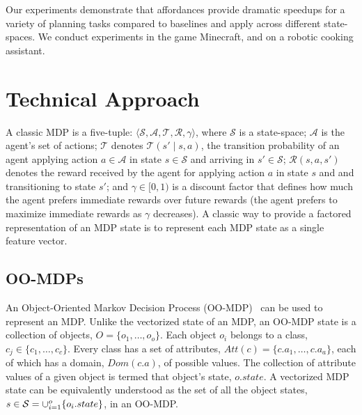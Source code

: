 \documentclass[conference]{IEEEtran}
\begin{document}
Our experiments demonstrate that affordances provide dramatic speedups for a variety
of planning tasks compared to baselines and apply across different state-spaces.  We 
conduct experiments in the game Minecraft, and on a robotic cooking assistant. 

\section{Technical Approach}
\label{sec:technical_approach}
A classic MDP is a five-tuple: $\langle \mathcal{S}, \mathcal{A}, \mathcal{T},
\mathcal{R}, \gamma \rangle$, where $\mathcal{S}$ is a state-space;
$\mathcal{A}$ is the agent's set of actions; $\mathcal{T}$ denotes
$\mathcal{T}(s' \mid s,a)$, the transition probability of an agent
applying action $a \in \mathcal{A}$ in state $s \in \mathcal{S}$ and
arriving in $s' \in \mathcal{S}$; $\mathcal{R}(s,a,s')$ denotes the
reward received by the agent for applying action $a$ in state $s$ and
and transitioning to state $s'$; and $\gamma \in [0, 1)$ is a discount
factor that defines how much the agent prefers immediate rewards
over future rewards (the agent prefers to maximize
immediate rewards as $\gamma$ decreases). A classic way to 
provide a factored representation of an MDP state is to represent
each MDP state as a single feature vector. 

\subsection{OO-MDPs}
An Object-Oriented Markov Decision Process (OO-MDP)~\citep{diuk08}
can be used to represent an MDP. Unlike the vectorized state of an MDP, 
an OO-MDP state is a collection of objects, $O = \{o_1, \ldots, o_o \}$. 
Each object $o_i$ belongs to a class, $c_j \in  \{c_1, \ldots, c_c\}$. Every
class has a set of attributes, $Att(c) = \{c.a_1, \ldots, c.a_a \}$, each of which
has a domain, $Dom(c.a)$, of possible values. The collection of attribute values
of a given object is termed that object's state, $o.state$. A vectorized MDP state
can be equivalently understood as the set of all the object states, 
$s \in {\cal S} = \cup_{i = 1}^o \{o_i.state\}$, in an OO-MDP. 

\end{document}
